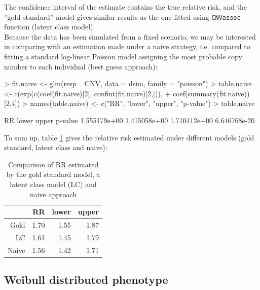 \documentclass[11pt]{article}
\begin{document}
The confidence interval of the estimate contains the true relative risk, and the ''gold standard'' model gives similar results as the one fitted
using \texttt{CNVassoc} function (latent class model). \\


Because the data has been simulated from a fixed scenario, we may be interested in comparing with an estimation made 
under a naive strategy, i.e. compared to fitting a standard log-linear Poisson model assigning the most probable copy number to each individual (best
guess approach):
\begin{Schunk}
\begin{Sinput}
> fit.naive <- glm(resp ~ CNV, data = dsim, family = "poisson")
> table.naive <- c(exp(c(coef(fit.naive)[2], confint(fit.naive)[2,])), 
+ coef(summary(fit.naive))[2,4])
> names(table.naive) <- c("RR", "lower", "upper", "p-value")
> table.naive
\end{Sinput}
\begin{Soutput}
          RR        lower        upper      p-value 
1.555179e+00 1.415058e+00 1.710412e+00 6.646768e-20 
\end{Soutput}
\end{Schunk}

To sum up, table \ref{table-compare} gives the relative risk estimated under different models (gold standard, latent class and naive):
\begin{table}[ht]
\begin{center}
\begin{tabular}{rrrr}
  \hline
 & RR & lower & upper \\ 
  \hline
Gold & 1.70 & 1.55 & 1.87 \\ 
  LC & 1.61 & 1.45 & 1.79 \\ 
  Naive & 1.56 & 1.42 & 1.71 \\ 
   \hline
\end{tabular}
\caption{Comparison of RR estimated by the gold standard model, a latent class model (LC) and naive approach}
\label{table-compare}
\end{center}
\end{table}

\subsection{Weibull distributed phenotype}
\end{document}
